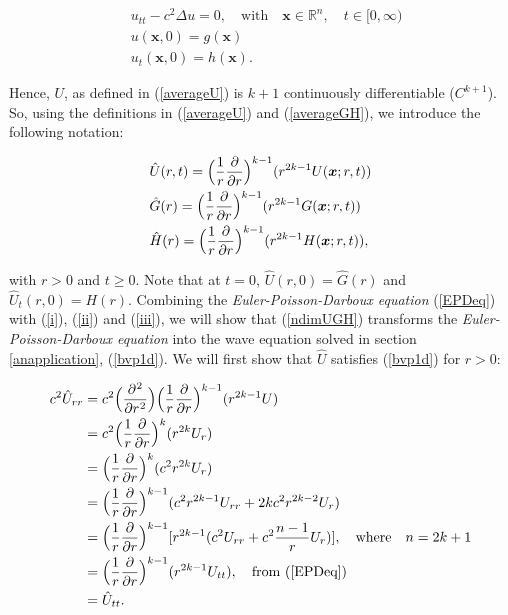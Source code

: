 \documentclass[a4paper, 12pt]{article}
\numberwithin{equation}{section}
\begin{document}
\begin{equation} \label{ndimeq}
    \begin{aligned}
        &u_{tt}-c^2\Delta u =0, \quad \textrm{with} \quad \boldsymbol{x} \in \mathbb{R}^n, \quad t \in [0, \infty)\\
        &u(\boldsymbol{x}, 0)=g(\boldsymbol{x})\\
        &u_t(\boldsymbol{x},0)=h(\boldsymbol{x}).
    \end{aligned}
\end{equation} 

Hence, $U$, as defined in (\ref{averageU}) is $k+1$ continuously differentiable
($C^{k+1}$). So, using the definitions in (\ref{averageU}) and
(\ref{averageGH}), we introduce the following notation:

\begin{equation} \label{ndimUGH}
    \begin{aligned}
        &\hat{U}(r,t)=\Big(\frac{1}{r} \diffp[1]{}{r} \Big)^{k-1} (r^{2k-1}U(\boldsymbol{x};r,t))\\
        &\hat{G}(r)=\Big(\frac{1}{r} \diffp[1]{}{r} \Big)^{k-1} (r^{2k-1}G(\boldsymbol{x};r,t))\\
        &\hat{H}(r)=\Big(\frac{1}{r} \diffp[1]{}{r} \Big)^{k-1} (r^{2k-1}H(\boldsymbol{x};r,t)),
    \end{aligned}
\end{equation}

with $r>0$ and $t \ge 0$. Note that at $t=0$, $\hat{U}(r,0)=\hat{G}(r)$ and
$\hat{U}_t(r,0)=H(r)$. Combining the \emph{Euler-Poisson-Darboux equation}
(\ref{EPDeq}) with (\ref{i}), (\ref{ii}) and (\ref{iii}), we will show that
(\ref{ndimUGH}) transforms the \emph{Euler-Poisson-Darboux equation} into the
wave equation solved in section \ref{anapplication}, (\ref{bvp1d}). We will
first show that $\hat{U}$ satisfies (\ref{bvp1d}) for $r>0$:

\begin{equation*}
    \begin{aligned}
        c^2\hat{U}_{rr}&=c^2\Big(\diffp[2]{}{r}\Big)\Big(\frac{1}{r} \diffp[1]{}{r}\Big)^{k-1}(r^{2k-1}U)\\
        &=c^2\Big(\frac{1}{r} \diffp[1]{}{r}\Big)^k(r^{2k}U_r)\\
        &=\Big(\frac{1}{r} \diffp[1]{}{r}\Big)^k(c^2r^{2k}U_r)\\
        &=\Big(\frac{1}{r} \diffp[1]{}{r}\Big)^{k-1}(c^2r^{2k-1}U_{rr}+2kc^2r^{2k-2}U_r)\\
        &=\Big(\frac{1}{r} \diffp[1]{}{r}\Big)^{k-1}[r^{2k-1}(c^2U_{rr}+c^2\frac{n-1}{r}U_r)], \quad \textrm{where} \quad n=2k+1\\
        &=\Big(\frac{1}{r} \diffp[1]{}{r}\Big)^{k-1}(r^{2k-1}U_{tt}), \quad \textrm{from (\ref{EPDeq})}\\
        &=\hat{U}_{tt}.
    \end{aligned}
\end{equation*}
\end{document}

